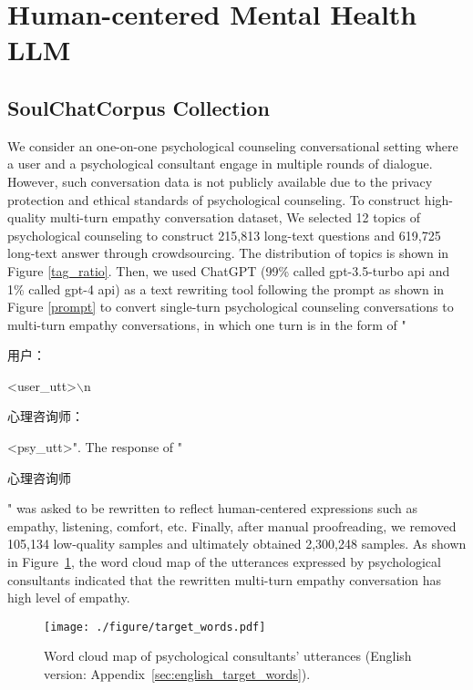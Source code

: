 \documentclass[11pt]{article}
\begin{document}
\section{Human-centered Mental Health LLM}
\label{sec:soulchat}
\subsection{SoulChatCorpus Collection}
We consider an one-on-one psychological counseling conversational setting where a user and a psychological consultant engage in multiple rounds of dialogue. However, such conversation data is not publicly available due to the privacy protection and ethical standards of psychological counseling. To construct high-quality multi-turn empathy conversation dataset, We selected 12 topics of psychological counseling to construct 215,813 long-text questions and 619,725 long-text answer through crowdsourcing. The distribution of topics is shown in Figure \ref{tag_ratio}. Then, we used ChatGPT (99\% called gpt-3.5-turbo api and 1\% called gpt-4 api) as a text rewriting tool following the prompt as shown in Figure \ref{prompt} to convert single-turn psychological counseling conversations to multi-turn empathy conversations, in which one turn is in the form of "\begin{CJK}{UTF8}{gbsn}用户：\end{CJK} <user\_utt>$\backslash$n\begin{CJK}{UTF8}{gbsn}心理咨询师：\end{CJK}<psy\_utt>". The response of "\begin{CJK}{UTF8}{gbsn}心理咨询师\end{CJK}" was asked to be rewritten to reflect human-centered expressions such as empathy, listening, comfort, etc. Finally, after manual proofreading, we removed 105,134 low-quality samples and ultimately obtained 2,300,248 samples. As shown in Figure~\ref{target_words}, the word cloud map of the utterances expressed by psychological consultants indicated that the rewritten multi-turn empathy conversation has high level of empathy.

\begin{figure}[htbp]
  \centering
  \texttt{[image: ./figure/target\_words.pdf]}
  \caption{Word cloud map of psychological consultants' utterances (English version: Appendix~\ref{sec:english_target_words}).
}
  \label{target_words}
\end{figure}
\end{document}
